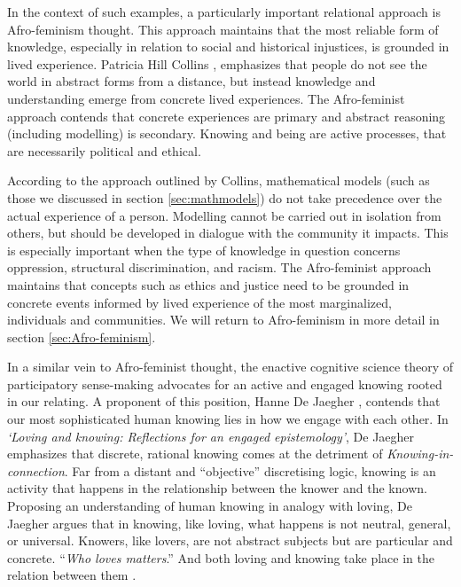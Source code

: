 In the context of such examples, a particularly important relational approach is Afro-feminism thought. This approach maintains that the most reliable form of knowledge, especially in relation to social and historical injustices, is grounded in lived experience. Patricia Hill Collins \cite{collins2002black}, emphasizes that people do not see the world in abstract forms from a distance, but instead knowledge and understanding emerge from concrete lived experiences. The Afro-feminist approach contends that concrete experiences are primary and abstract reasoning (including modelling) is secondary. Knowing and being are active processes, that are necessarily political and ethical. 

According to the approach outlined by Collins, mathematical models (such as those we discussed in section \ref{sec:mathmodels}) do not take precedence over the actual experience of a person. Modelling cannot be carried out in isolation from others, but should be developed in dialogue with the community it impacts. This is especially important when the type of knowledge in question concerns oppression, structural discrimination, and racism. The Afro-feminist approach maintains that concepts such as ethics and justice need to be grounded in concrete events informed by lived experience of the most marginalized, individuals and communities. We will return to Afro-feminism in more detail in section \ref{sec:Afro-feminism}.

In a similar vein to Afro-feminist thought, the enactive cognitive science theory of participatory sense-making \cite{de2007participatory} advocates for an active and engaged knowing rooted in our relating. A proponent of this position, Hanne De Jaegher \cite{de2019loving}, contends that our most sophisticated human knowing lies in how we engage with each other. In \textit{`Loving and knowing: Reflections for an engaged epistemology'}, De Jaegher \cite{de2019loving} emphasizes that discrete, rational knowing comes at the detriment of \textit{Knowing-in-connection}. Far from a distant and ``objective'' discretising logic, knowing is an activity that happens in the relationship between the knower and the known. Proposing an understanding of human knowing in analogy with loving, De Jaegher argues that in knowing, like loving, what happens is not neutral, general, or universal. Knowers, like lovers, are not abstract subjects but are particular and concrete. ``\textit{Who loves matters}.'' And both loving and knowing take place in the relation between them \cite{de2019loving}. 

